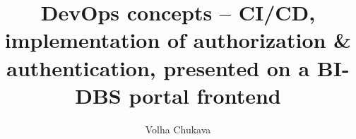 \title{DevOps concepts -- CI/CD, implementation of authorization \& authentication, presented on a BI-DBS portal frontend}
\author{Volha Chukava} 
